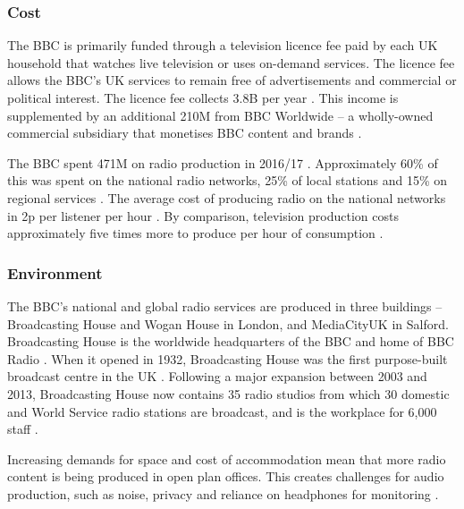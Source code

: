 \subsubsection{Cost}
The BBC is primarily funded through a television licence fee paid by each UK household that watches live television or
uses on-demand services. The licence fee allows the BBC's UK services to remain free of advertisements and commercial
or political interest. The licence fee collects \textsterling3.8B per year \citep{TVLicensing2017}.  This income is
supplemented by an additional \textsterling210M from BBC Worldwide -- a wholly-owned commercial subsidiary that
monetises BBC content and brands \citep{BBCWorldwide2017}.

The BBC spent \textsterling471M on radio production in 2016/17 \citep[p. 111]{Ofcom2017}. Approximately 60\% of this
was spent on the national radio networks, 25\% of local stations and 15\% on regional services \citep{BBC2017a}.  The
average cost of producing radio on the national networks in 2p per listener per hour \citep[p.~27]{BBC2017a}.  By
comparison, television production costs approximately five times more to produce per hour of consumption \citep[pp. 25,
27]{BBC2017a}.

\subsubsection{Environment}
The BBC's national and global radio services are produced in three buildings -- Broadcasting House and Wogan House in
London, and MediaCityUK in Salford.  Broadcasting House is the worldwide headquarters of the BBC and home of BBC Radio
\citep{Hines2008}. When it opened in 1932, Broadcasting House was the first purpose-built broadcast centre in the UK
\citep{BBC2015a}.  Following a major expansion between 2003 and 2013, Broadcasting House now contains 35 radio studios
from which 30 domestic and World Service radio stations are broadcast, and is the workplace for 6,000 staff
\citep{BBCNews2013}.

Increasing demands for space and cost of accommodation mean that more radio content is being produced in open plan
offices. This creates challenges for audio production, such as noise, privacy and reliance on headphones for monitoring
\citep{Brixen2003}.


